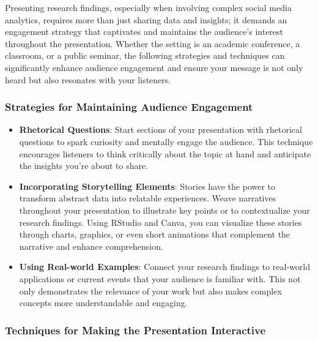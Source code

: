 \documentclass[
]{book}
\begin{document}
Presenting research findings, especially when involving complex social media analytics, requires more than just sharing data and insights; it demands an engagement strategy that captivates and maintains the audience's interest throughout the presentation. Whether the setting is an academic conference, a classroom, or a public seminar, the following strategies and techniques can significantly enhance audience engagement and ensure your message is not only heard but also resonates with your listeners.

\hypertarget{strategies-for-maintaining-audience-engagement}{%
\subsubsection{Strategies for Maintaining Audience Engagement}\label{strategies-for-maintaining-audience-engagement}}

\begin{itemize}
\item
  \textbf{Rhetorical Questions}: Start sections of your presentation with rhetorical questions to spark curiosity and mentally engage the audience. This technique encourages listeners to think critically about the topic at hand and anticipate the insights you're about to share.
\item
  \textbf{Incorporating Storytelling Elements}: Stories have the power to transform abstract data into relatable experiences. Weave narratives throughout your presentation to illustrate key points or to contextualize your research findings. Using RStudio and Canva, you can visualize these stories through charts, graphics, or even short animations that complement the narrative and enhance comprehension.
\item
  \textbf{Using Real-world Examples}: Connect your research findings to real-world applications or current events that your audience is familiar with. This not only demonstrates the relevance of your work but also makes complex concepts more understandable and engaging.
\end{itemize}

\hypertarget{techniques-for-making-the-presentation-interactive}{%
\subsubsection{Techniques for Making the Presentation Interactive}\label{techniques-for-making-the-presentation-interactive}}
\end{document}
